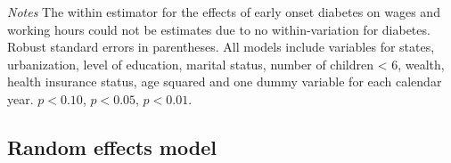 \documentclass[12pt,english]{article}
\begin{document}
\begin{table}[p]
\begin{center}
\begin{adjustbox}{max width=\linewidth}
\begin{threeparttable}
{\begin{tabular}{l*{6}{S S}}
						\bottomrule
					\end{tabular}
					\begin{tablenotes}
						\item \footnotesize \textit{Notes} The within estimator for the effects of early onset diabetes on wages and working hours could not be estimates due to no within-variation for diabetes. Robust standard errors in parentheses. All models include variables for  states, urbanization, level of education, marital status, number of children < 6, wealth, health insurance status, age squared and one dummy variable for each calendar year. \sym{*} \(p<0.10\), \sym{**} \(p<0.05\), \sym{***} \(p<0.01\).
					\end{tablenotes}
				}
			\end{threeparttable}
		\end{adjustbox}
	\end{center}
\end{table}

\clearpage

\subsection*{Random effects model}
\end{document}
